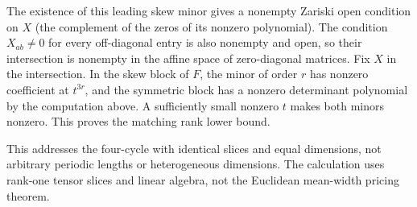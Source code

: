 \documentclass[
  11pt,
]{article}
\begin{document}
The existence of this leading skew minor gives a nonempty Zariski open
condition on \(X\) (the complement of the zeros of its nonzero
polynomial). The condition \(X_{ab}\ne0\) for every off-diagonal entry
is also nonempty and open, so their intersection is nonempty in the
affine space of zero-diagonal matrices. Fix \(X\) in the intersection.
In the skew block of \(F\), the minor of order \(r\) has nonzero
coefficient at \(t^{3r}\), and the symmetric block has a nonzero
determinant polynomial by the computation above. A sufficiently small
nonzero \(t\) makes both minors nonzero. This proves the matching rank
lower bound.

This addresses the four-cycle with identical slices and equal
dimensions, not arbitrary periodic lengths or heterogeneous dimensions.
The calculation uses rank-one tensor slices and linear algebra, not the
Euclidean mean-width pricing theorem.
\end{document}
